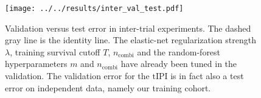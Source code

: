 \begin{figure}
    \centering
    \texttt{[image: ../../results/inter\_val\_test.pdf]}
    \caption{Validation versus test error in inter-trial experiments. The dashed gray line is the 
        identity line. The elastic-net regularization strength $\lambda$, training survival cutoff 
        $T$, $n_\text{combi}$ and the random-forest hyperparameters $m$ and $n_\text{combi}$ 
        have already been tuned in the validation. The validation error for the $\text{tIPI}$ is in 
        fact also a test error on independent data, namely our training cohort.}
    \label{fig:inter-val-test}
\end{figure}